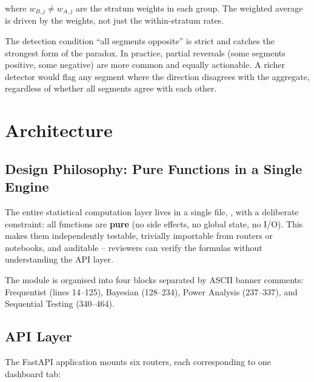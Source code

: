 where $w_{B,j} \neq w_{A,j}$ are the stratum weights in each group. The
weighted average is driven by the weights, not just the within-stratum rates.

\begin{keyinsight}
  The detection condition ``all segments opposite'' is strict and catches the
  strongest form of the paradox. In practice, partial reversals (some segments
  positive, some negative) are more common and equally actionable. A richer
  detector would flag any segment where the direction disagrees with the
  aggregate, regardless of whether all segments agree with each other.
\end{keyinsight}

\section{Architecture}
\label{sec:abtest-architecture}


\subsection{Design Philosophy: Pure Functions in a Single Engine}

The entire statistical computation layer lives in a single file,
, with a deliberate constraint: all functions are
\textbf{pure} (no side effects, no global state, no I/O). This makes them
independently testable, trivially importable from routers or notebooks, and
auditable -- reviewers can verify the formulas without understanding the API
layer.

The module is organised into four blocks separated by ASCII banner comments:
Frequentist (lines 14--125), Bayesian (128--234), Power Analysis (237--337),
and Sequential Testing (340--464).

\subsection{API Layer}

The FastAPI application mounts six routers, each corresponding to one dashboard
tab:

